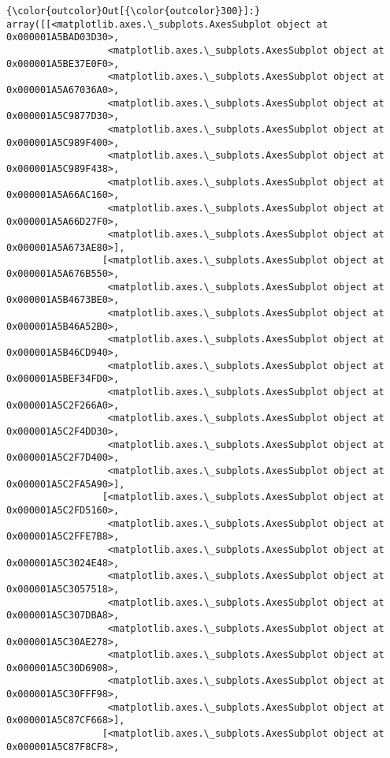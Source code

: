 \documentclass[11pt]{article}
\begin{document}
\begin{Verbatim}[commandchars=\\\{\}]
{\color{outcolor}Out[{\color{outcolor}300}]:} array([[<matplotlib.axes.\_subplots.AxesSubplot object at 0x000001A5BAD03D30>,
                  <matplotlib.axes.\_subplots.AxesSubplot object at 0x000001A5BE37E0F0>,
                  <matplotlib.axes.\_subplots.AxesSubplot object at 0x000001A5A67036A0>,
                  <matplotlib.axes.\_subplots.AxesSubplot object at 0x000001A5C9877D30>,
                  <matplotlib.axes.\_subplots.AxesSubplot object at 0x000001A5C989F400>,
                  <matplotlib.axes.\_subplots.AxesSubplot object at 0x000001A5C989F438>,
                  <matplotlib.axes.\_subplots.AxesSubplot object at 0x000001A5A66AC160>,
                  <matplotlib.axes.\_subplots.AxesSubplot object at 0x000001A5A66D27F0>,
                  <matplotlib.axes.\_subplots.AxesSubplot object at 0x000001A5A673AE80>],
                 [<matplotlib.axes.\_subplots.AxesSubplot object at 0x000001A5A676B550>,
                  <matplotlib.axes.\_subplots.AxesSubplot object at 0x000001A5B4673BE0>,
                  <matplotlib.axes.\_subplots.AxesSubplot object at 0x000001A5B46A52B0>,
                  <matplotlib.axes.\_subplots.AxesSubplot object at 0x000001A5B46CD940>,
                  <matplotlib.axes.\_subplots.AxesSubplot object at 0x000001A5BEF34FD0>,
                  <matplotlib.axes.\_subplots.AxesSubplot object at 0x000001A5C2F266A0>,
                  <matplotlib.axes.\_subplots.AxesSubplot object at 0x000001A5C2F4DD30>,
                  <matplotlib.axes.\_subplots.AxesSubplot object at 0x000001A5C2F7D400>,
                  <matplotlib.axes.\_subplots.AxesSubplot object at 0x000001A5C2FA5A90>],
                 [<matplotlib.axes.\_subplots.AxesSubplot object at 0x000001A5C2FD5160>,
                  <matplotlib.axes.\_subplots.AxesSubplot object at 0x000001A5C2FFE7B8>,
                  <matplotlib.axes.\_subplots.AxesSubplot object at 0x000001A5C3024E48>,
                  <matplotlib.axes.\_subplots.AxesSubplot object at 0x000001A5C3057518>,
                  <matplotlib.axes.\_subplots.AxesSubplot object at 0x000001A5C307DBA8>,
                  <matplotlib.axes.\_subplots.AxesSubplot object at 0x000001A5C30AE278>,
                  <matplotlib.axes.\_subplots.AxesSubplot object at 0x000001A5C30D6908>,
                  <matplotlib.axes.\_subplots.AxesSubplot object at 0x000001A5C30FFF98>,
                  <matplotlib.axes.\_subplots.AxesSubplot object at 0x000001A5C87CF668>],
                 [<matplotlib.axes.\_subplots.AxesSubplot object at 0x000001A5C87F8CF8>,

\end{Verbatim}
\end{document}
